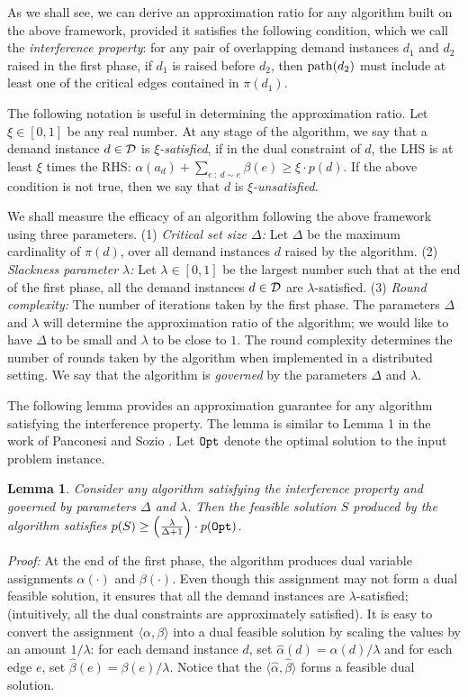 \documentclass[11pt]{article}
\newtheorem{lemma}[theorem]{\bf Lemma}
\newcommand{\proof} {{\it Proof: }}
\newcommand{\calD} {{\cal D}}
\newcommand{\wh}[1] {\widehat{#1}}
\newcommand{\Opt} {{\tt Opt}}
\newcommand{\mypath} {{\rm path}}
\begin{document}
As we shall see, we can derive an approximation ratio for any 
algorithm built on the above framework, provided it satisfies the following condition,
which we call the {\em interference property}:
for any pair of overlapping demand instances $d_1$ and $d_2$ raised in the first phase,
if $d_1$ is raised before $d_2$, 
then $\mypath(d_2)$ must include at least one of the critical edges contained in $\pi(d_1)$. 

The following notation is useful in determining the approximation ratio.
Let $\xi\in [0,1]$ be any real number.
At any stage of the algorithm, we say that a demand instance $d\in \calD$ is
{\em $\xi$-satisfied}, if in the dual constraint of $d$,
the LHS is at least $\xi$ times the RHS:
$\alpha(a_d) + \sum_{e~:~d\sim e} \beta(e) \geq \xi \cdot p(d)$.
If the above condition is not true, then we say that $d$ is {\em $\xi$-unsatisfied}.

We shall measure the efficacy of an algorithm following the above framework using three parameters.
(1) {\em Critical set size $\Delta$: }Let $\Delta$ be the maximum cardinality of $\pi(d)$,
over all demand instances $d$ raised by the algorithm.
(2) {\em Slackness parameter $\lambda$: }Let $\lambda\in [0,1]$ be the largest number such that
at the end of the first phase, all the demand instances $d\in \calD$ are $\lambda$-satisfied.
(3) {\em Round complexity: }The number of iterations taken by the first phase.
The parameters $\Delta$ and $\lambda$ will determine the approximation ratio of the algorithm;
we would like to have $\Delta$ to be small and $\lambda$ to be close to $1$.
The round complexity determines the number of rounds taken by the algorithm when implemented in a distributed setting.
We say that the algorithm is {\em governed} by the parameters $\Delta$ and $\lambda$.

The following lemma provides an approximation guarantee for any algorithm satisfying the interference property.
The lemma is similar to Lemma 1 {in} the work of Panconesi and Sozio \cite{Pancc}. 
Let $\Opt$ denote the optimal solution to the input problem instance.

\begin{lemma}
\label{lem:AAA}
Consider any algorithm satisfying the interference property and governed by parameters $\Delta$ and $\lambda$.
Then the feasible solution $S$ produced by the algorithm satisfies 
$p(S)\geq \left(\frac{\lambda}{\Delta+1}\right)\cdot p(\Opt)$.
\end{lemma}
\proof
At the end of the first phase,
the algorithm produces dual variable assignments $\alpha(\cdot)$ and $\beta(\cdot)$.
Even though this assignment may not form a dual feasible solution,
it ensures that all the demand instances are $\lambda$-satisfied;
(intuitively, all the dual constraints are approximately satisfied).
It is easy to convert the assignment $\langle \alpha, \beta\rangle$ into a dual feasible solution
by scaling the values by an amount $1/\lambda$:
for each demand instance $d$, set $\wh{\alpha}(d) = \alpha(d)/\lambda$ and 
for each edge $e$, set $\wh{\beta}(e)=\beta(e)/\lambda$.
Notice that the $\langle \wh{\alpha},\wh{\beta}\rangle$ forms a feasible dual solution.
\end{document}
